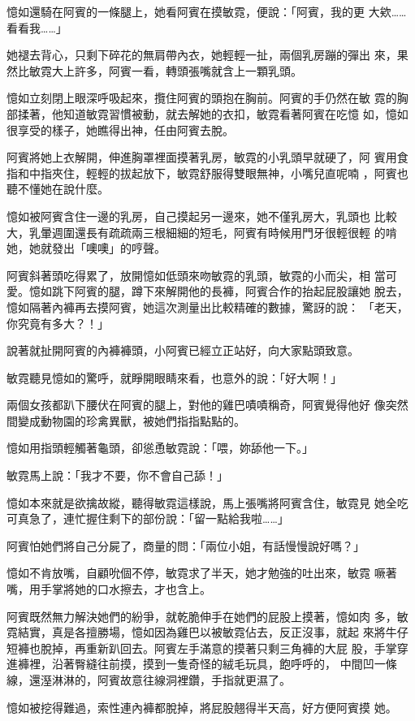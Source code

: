 憶如還騎在阿賓的一條腿上，她看阿賓在摸敏霓，便說：「阿賓，我的更
大欸……看看我……」

她褪去背心，只剩下碎花的無肩帶內衣，她輕輕一扯，兩個乳房蹦的彈出
來，果然比敏霓大上許多，阿賓一看，轉頭張嘴就含上一顆乳頭。

憶如立刻閉上眼深呼吸起來，攬住阿賓的頭抱在胸前。阿賓的手仍然在敏
霓的胸部揉著，他知道敏霓習慣被動，就去解她的衣扣，敏霓看著阿賓在吃憶
如，憶如很享受的樣子，她瞧得出神，任由阿賓去脫。

阿賓將她上衣解開，伸進胸罩裡面摸著乳房，敏霓的小乳頭早就硬了，阿
賓用食指和中指夾住，輕輕的拔起放下，敏霓舒服得雙眼無神，小嘴兒直呢喃
，阿賓也聽不懂她在說什麼。

憶如被阿賓含住一邊的乳房，自己摸起另一邊來，她不僅乳房大，乳頭也
比較大，乳暈週圍還長有疏疏兩三根細細的短毛，阿賓有時候用門牙很輕很輕
的啃她，她就發出「噢噢」的哼聲。

阿賓斜著頭吃得累了，放開憶如低頭來吻敏霓的乳頭，敏霓的小而尖，相
當可愛。憶如跳下阿賓的腿，蹲下來解開他的長褲，阿賓合作的抬起屁股讓她
脫去，憶如隔著內褲再去摸阿賓，她這次測量出比較精確的數據，驚訝的說：
「老天，你究竟有多大？！」

說著就扯開阿賓的內褲褲頭，小阿賓已經立正站好，向大家點頭致意。

敏霓聽見憶如的驚呼，就睜開眼睛來看，也意外的說：「好大啊！」

兩個女孩都趴下腰伏在阿賓的腿上，對他的雞巴嘖嘖稱奇，阿賓覺得他好
像突然間變成動物園的珍禽異獸，被她們指指點點的。

憶如用指頭輕觸著龜頭，卻慫恿敏霓說：「喂，妳舔他一下。」

敏霓馬上說：「我才不要，你不會自己舔！」

憶如本來就是欲擒故縱，聽得敏霓這樣說，馬上張嘴將阿賓含住，敏霓見
她全吃可真急了，連忙握住剩下的部份說：「留一點給我啦……」

阿賓怕她們將自己分屍了，商量的問：「兩位小姐，有話慢慢說好嗎？」

憶如不肯放嘴，自顧吮個不停，敏霓求了半天，她才勉強的吐出來，敏霓
噘著嘴，用手掌將她的口水擦去，才也含上。

阿賓既然無力解決她們的紛爭，就乾脆伸手在她們的屁股上摸著，憶如肉
多，敏霓結實，真是各擅勝場，憶如因為雞巴以被敏霓佔去，反正沒事，就起
來將牛仔短褲也脫掉，再重新趴回去。阿賓左手滿意的摸著只剩三角褲的大屁
股，手掌穿進褲裡，沿著臀縫往前摸，摸到一隻奇怪的絨毛玩具，飽呼呼的，
中間凹一條線，還溼淋淋的，阿賓故意往線洞裡鑽，手指就更濕了。

憶如被挖得難過，索性連內褲都脫掉，將屁股翹得半天高，好方便阿賓摸
她。

